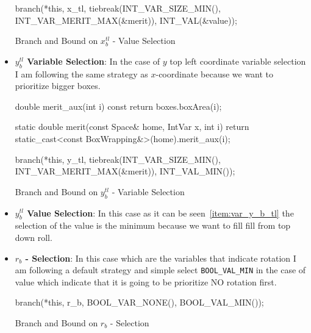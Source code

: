 \documentclass[12pt, a4paper]{article}
\begin{document}
\begin{itemize}
\begin{listing}[H]
\begin{cppcode*}{}
  branch(*this, x_tl,
                tiebreak(INT_VAR_SIZE_MIN(),
                         INT_VAR_MERIT_MAX(&merit)),
                INT_VAL(&value));
\end{cppcode*}
\caption{Branch and Bound on $x_b^{tl}$ - Value Selection}
\label{lst:branch_val_x_tl}
\end{listing}

\item\label{item:var_y_b_tl} \textbf{$y_b^{tl}$ Variable Selection}: In the case of $y$ top left coordinate variable selection I am following the same strategy as $x$-coordinate because we want to prioritize bigger boxes.

\begin{listing}[H]
\begin{cppcode*}{}
  double merit_aux(int i) const{
    return boxes.boxArea(i);
  }

  static double merit(const Space& home, IntVar x, int i) {
    return static_cast<const BoxWrapping&>(home).merit_aux(i);
  }

  branch(*this, y_tl,
                tiebreak(INT_VAR_SIZE_MIN(), INT_VAR_MERIT_MAX(&merit)),
                INT_VAL_MIN());
\end{cppcode*}
\caption{Branch and Bound on $y_b^{tl}$ - Variable Selection}
\label{lst:branch_var_y_tl}
\end{listing}

\item \textbf{$y_b^{tl}$ Value Selection}: In this case as it can be seen~\ref{item:var_y_b_tl} the selection of the value is the minimum because we want to fill fill from top down roll.

\item \textbf{$r_b$ - Selection}: In this case which are the variables that indicate rotation I am following a default strategy and simple select \texttt{BOOL_VAL_MIN} in the case of value which indicate that it is going to be prioritize NO rotation first.

\begin{listing}[H]
\begin{cppcode*}{}
  branch(*this, r_b, BOOL_VAR_NONE(), BOOL_VAL_MIN());
\end{cppcode*}
\caption{Branch and Bound on $r_b$ - Selection}
\label{lst:branch_r_b}
\end{listing}

\end{itemize}
\end{document}
